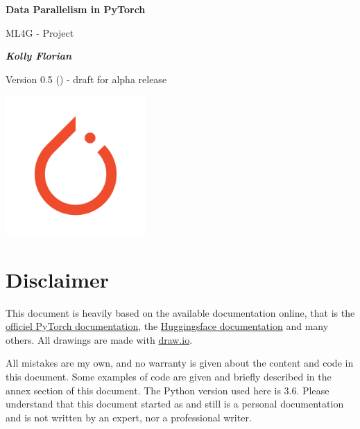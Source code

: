 \documentclass{article}
\begin{document}
\begin{titlepage}
  \begin{center}
    \Huge
    \textbf{\textcolor{def}{Data Parallelism in PyTorch}}
    \vspace{0.9cm}

    \LARGE
    ML4G - Project

    \vspace{1.9cm}
    \Large
    \textbf{\emph{Kolly Florian}}
    \vspace{5cm}
  \end{center}
  Version 0.5 (\DTMnow) - draft for alpha release
  \begin{center}
    \vspace{5cm}
    \includegraphics[width=0.4\textwidth]{images/pytorch-logo.png}
    \vspace{10cm}
  \end{center}
\end{titlepage}

\setlength{\parindent}{0em}
\setlength{\parskip}{0.2em}

\tableofcontents
\newpage

\section{Disclaimer}
This document is heavily based on the available documentation online, that is the \href{https://pytorch.org/docs/stable/index.html}{officiel PyTorch documentation}, the \href{https://huggingface.co/docs}{Huggingsface documentation} and many others. All drawings are made with \href{https://www.draw.io}{draw.io}.

All mistakes are my own, and no warranty is given about the content and code in this document. Some examples of code are given and briefly described in the annex section of this document. The Python version used here is 3.6. Please understand that this document started as and still is a personal documentation and is not written by an expert, nor a professional writer.
\end{document}
